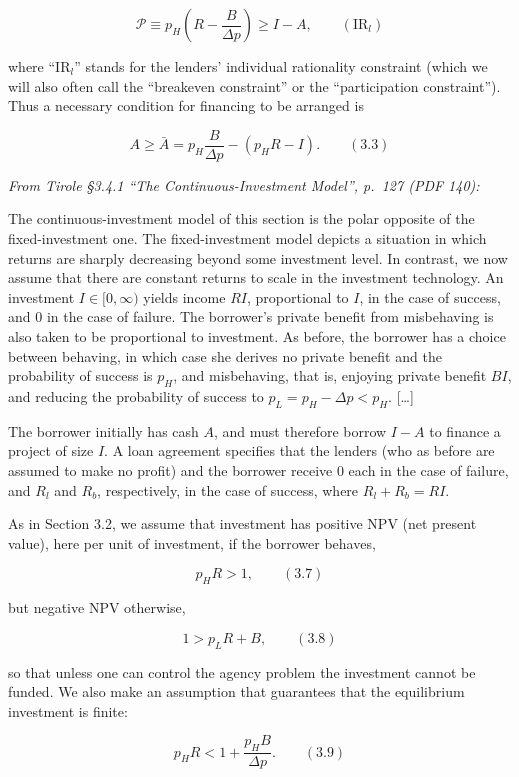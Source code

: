 \documentclass[11pt,a4paper]{article}
\begin{document}
\[\mathcal{P} \equiv p_H\left(R - \frac{B}{\Delta p}\right) \geqslant I - A, \qquad (\text{IR}_l)\]

where ``IR\(_l\)'' stands for the lenders' individual rationality constraint (which we will also
often call the ``breakeven constraint'' or the ``participation constraint''). Thus a necessary
condition for financing to be arranged is

\[A \geqslant \bar A = p_H \frac{B}{\Delta p} - (p_H R - I). \qquad (3.3)\]

\emph{From Tirole §3.4.1 ``The Continuous-Investment Model'', p.~127 (PDF 140):}

The continuous-investment model of this section is the polar opposite of the fixed-investment one.
The fixed-investment model depicts a situation in which returns are sharply decreasing beyond some
investment level. In contrast, we now assume that there are constant returns to scale in the
investment technology. An investment \(I \in [0, \infty)\) yields income \(RI\), proportional to
\(I\), in the case of success, and 0 in the case of failure. The borrower's private benefit from
misbehaving is also taken to be proportional to investment. As before, the borrower has a choice
between behaving, in which case she derives no private benefit and the probability of success is
\(p_H\), and misbehaving, that is, enjoying private benefit \(BI\), and reducing the probability of
success to \(p_L = p_H - \Delta p < p_H\). {[}\ldots{]}

The borrower initially has cash \(A\), and must therefore borrow \(I - A\) to finance a project of
size \(I\). A loan agreement specifies that the lenders (who as before are assumed to make no
profit) and the borrower receive 0 each in the case of failure, and \(R_l\) and \(R_b\),
respectively, in the case of success, where \(R_l + R_b = RI\).

As in Section 3.2, we assume that investment has positive NPV (net present value), here per unit of
investment, if the borrower behaves,

\[p_H R > 1, \qquad (3.7)\]

but negative NPV otherwise,

\[1 > p_L R + B, \qquad (3.8)\]

so that unless one can control the agency problem the investment cannot be funded. We also make an
assumption that guarantees that the equilibrium investment is finite:

\[p_H R < 1 + \frac{p_H B}{\Delta p}. \qquad (3.9)\]
\end{document}
